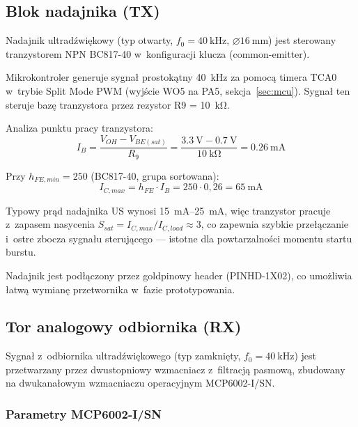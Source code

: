\documentclass[a4paper,11pt]{article}
\begin{document}
\subsection{Blok nadajnika (TX)}
\label{sec:nadajnik}

Nadajnik ultradźwiękowy (typ otwarty, $f_0 = \SI{40}{\kilo\hertz}$,
$\varnothing\SI{16}{\milli\metre}$) jest sterowany tranzystorem NPN BC817-40
w~konfiguracji klucza (common-emitter).

Mikrokontroler generuje sygnał prostokątny \SI{40}{\kilo\hertz} za pomocą
timera TCA0 w~trybie Split Mode PWM (wyjście WO5 na PA5, sekcja~\ref{sec:mcu}).
Sygnał ten steruje bazę tranzystora
przez rezystor R9 = \SI{10}{\kilo\ohm}.

Analiza punktu pracy tranzystora:
\begin{equation}
    I_B = \frac{V_{OH} - V_{BE(sat)}}{R_9} = \frac{\SI{3,3}{\volt} - \SI{0,7}{\volt}}{\SI{10}{\kilo\ohm}} = \SI{0,26}{\milli\ampere}
    \label{eq:ib}
\end{equation}

Przy $h_{FE,min} = 250$ (BC817-40, grupa sortowana):
\begin{equation}
    I_{C,max} = h_{FE} \cdot I_B = 250 \cdot 0{,}26 = \SI{65}{\milli\ampere}
    \label{eq:ic_max}
\end{equation}

Typowy prąd nadajnika US wynosi \SIrange{15}{25}{\milli\ampere}, więc
tranzystor pracuje z~zapasem nasycenia $S_{sat} = I_{C,max} / I_{C,load}
\approx 3$, co zapewnia szybkie przełączanie i~ostre zbocza sygnału
sterującego --- istotne dla powtarzalności momentu startu burstu.

Nadajnik jest podłączony przez goldpinowy header (PINHD-1X02), co
umożliwia łatwą wymianę przetwornika w~fazie prototypowania.

\subsection{Tor analogowy odbiornika (RX)}
\label{sec:tor_rx}

Sygnał z~odbiornika ultradźwiękowego (typ zamknięty, $f_0 = \SI{40}{\kilo\hertz}$)
jest przetwarzany przez dwustopniowy wzmacniacz z~filtracją pasmową, zbudowany
na dwukanałowym wzmacniaczu operacyjnym MCP6002-I/SN.

\subsubsection{Parametry MCP6002-I/SN}
\end{document}
